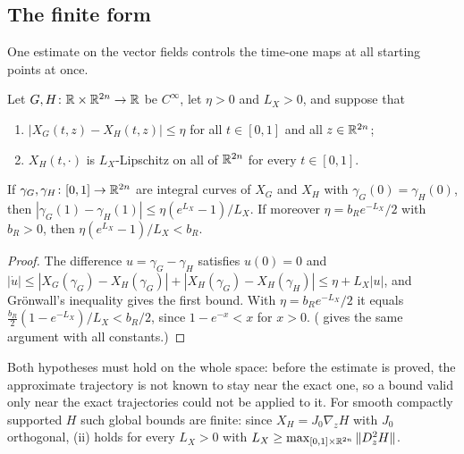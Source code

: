\subsection{The finite form}\label{sec:eff-finite}

One estimate on the vector fields controls the time-one maps at all starting points at once.

\begin{lemma}[Gr\"onwall]\label{lem:eff-gronwall}
Let $G,H\colon\mathbb{R}\times\mathbb{R}^{2n}\to\mathbb{R}$ be $C^\infty$, let $\eta>0$ and $L_X>0$, and suppose that
\begin{enumerate}[label=(\roman*)]
\item $|X_G(t,z)-X_H(t,z)|\le\eta$ for all $t\in[0,1]$ and all $z\in\mathbb{R}^{2n}$;
\item $X_H(t,\cdot)$ is $L_X$-Lipschitz on all of $\mathbb{R}^{2n}$ for every $t\in[0,1]$.
\end{enumerate}
If $\gamma_G,\gamma_H\colon[0,1]\to\mathbb{R}^{2n}$ are integral curves of $X_G$ and $X_H$ with
$\gamma_G(0)=\gamma_H(0)$, then $|\gamma_G(1)-\gamma_H(1)|\le\eta(e^{L_X}-1)/L_X$. If moreover
$\eta=b_Re^{-L_X}/2$ with $b_R>0$, then $\eta(e^{L_X}-1)/L_X<b_R$.
\end{lemma}

\begin{proof}
The difference $u=\gamma_G-\gamma_H$ satisfies $u(0)=0$ and
$|\dot u|\le|X_G(\gamma_G)-X_H(\gamma_G)|+|X_H(\gamma_G)-X_H(\gamma_H)|\le\eta+L_X|u|$, and Gr\"onwall's
inequality gives the first bound. With $\eta=b_Re^{-L_X}/2$ it equals $\tfrac{b_R}2(1-e^{-L_X})/L_X<b_R/2$, since
$1-e^{-x}<x$ for $x>0$. ( gives the same argument with all constants.)
\end{proof}

Both hypotheses must hold on the whole space: before the estimate is proved, the approximate trajectory is not
known to stay near the exact one, so a bound valid only near the exact trajectories could not be applied to it.
For smooth compactly supported $H$ such global bounds are finite: since $X_H=J_0\nabla_zH$ with $J_0$ orthogonal,
(ii) holds for every $L_X>0$ with $L_X\ge\max_{[0,1]\times\mathbb{R}^{2n}}\|D^2_zH\|$.

